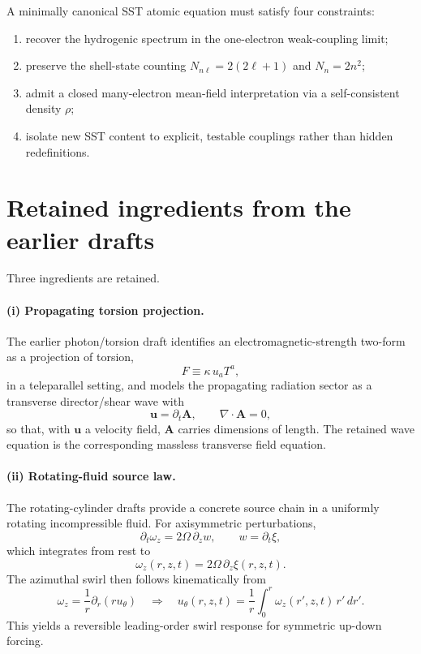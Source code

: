 \documentclass[11pt,a4paper]{article}
\begin{document}
A minimally canonical SST atomic equation must satisfy four constraints:
\begin{enumerate}[label=(C\arabic*)]
    \item recover the hydrogenic spectrum in the one-electron weak-coupling limit;
    \item preserve the shell-state counting $N_{n\ell}=2(2\ell+1)$ and $N_n=2n^2$;
    \item admit a closed many-electron mean-field interpretation via a self-consistent density $\rho$;
    \item isolate new SST content to explicit, testable couplings rather than hidden redefinitions.
\end{enumerate}

\section{Retained ingredients from the earlier drafts}
Three ingredients are retained.

\paragraph{(i) Propagating torsion projection.} The earlier photon/torsion draft identifies an electromagnetic-strength two-form as a projection of torsion,
\begin{equation}
\label{eq:Ftorsion}
F \equiv \kappa\,u_a T^a,
\end{equation}
in a teleparallel setting, and models the propagating radiation sector as a transverse director/shear wave with
\begin{equation}
\label{eq:uA}
\mathbf{u}=\partial_t \mathbf{A},
\qquad
\nabla\cdot \mathbf{A}=0,
\end{equation}
so that, with $\mathbf u$ a velocity field, $\mathbf A$ carries dimensions of length. The retained wave equation is the corresponding massless transverse field equation.

\paragraph{(ii) Rotating-fluid source law.} The rotating-cylinder drafts provide a concrete source chain in a uniformly rotating incompressible fluid. For axisymmetric perturbations,
\begin{equation}
\label{eq:wz}
\partial_t \omega_z = 2\Omega\,\partial_z w,
\qquad
w=\partial_t \xi,
\end{equation}
which integrates from rest to
\begin{equation}
\label{eq:wzxi}
\omega_z(r,z,t)=2\Omega\,\partial_z \xi(r,z,t).
\end{equation}
The azimuthal swirl then follows kinematically from
\begin{equation}
\label{eq:utheta}
\omega_z = \frac{1}{r}\partial_r(r u_\theta)
\quad\Longrightarrow\quad
u_\theta(r,z,t)=\frac{1}{r}\int_0^r \omega_z(r',z,t)\,r'\,dr'.
\end{equation}
This yields a reversible leading-order swirl response for symmetric up-down forcing.
\end{document}
